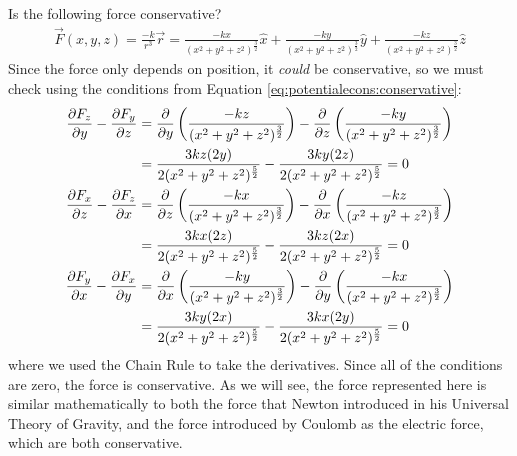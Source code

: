 \begin{example}{\label{ex:potentialecons:gravitycons}Is the following force conservative?
\begin{align*}
\vec F(x,y,z) = \frac{-k}{r^3}\vec r = \frac{-kx}{(x^2+y^2+z^2)^\frac{3}{2}}\hat x + \frac{-ky}{(x^2+y^2+z^2)^\frac{3}{2}}\hat y + \frac{-kz}{(x^2+y^2+z^2)^\frac{3}{2}}\hat z
\end{align*}}
Since the force only depends on position, it \textit{could} be conservative, so we must check using the conditions from Equation \ref{eq:potentialecons:conservative}:
\begin{align*}
\frac{\partial F_z}{\partial y}-\frac{\partial F_y}{\partial z} &= \frac{\partial }{\partial y}\left(\frac{-kz}{(x^2+y^2+z^2)^\frac{3}{2}}\right)-\frac{\partial }{\partial z}\left( \frac{-ky}{(x^2+y^2+z^2)^\frac{3}{2}}\right)\\
&=\frac{3kz(2y)}{2(x^2+y^2+z^2)^\frac{5}{2}}-\frac{3ky(2z)}{2(x^2+y^2+z^2)^\frac{5}{2}} = 0\\
\frac{\partial F_x}{\partial z}-\frac{\partial F_z}{\partial x} &= \frac{\partial }{\partial z}\left(\frac{-kx}{(x^2+y^2+z^2)^\frac{3}{2}}\right)-\frac{\partial }{\partial x}\left( \frac{-kz}{(x^2+y^2+z^2)^\frac{3}{2}}\right)\\
&=\frac{3kx(2z)}{2(x^2+y^2+z^2)^\frac{5}{2}}-\frac{3kz(2x)}{2(x^2+y^2+z^2)^\frac{5}{2}} = 0\\
\frac{\partial F_y}{\partial x}-\frac{\partial F_x}{\partial y} &= \frac{\partial }{\partial x}\left(\frac{-ky}{(x^2+y^2+z^2)^\frac{3}{2}}\right)-\frac{\partial }{\partial y}\left( \frac{-kx}{(x^2+y^2+z^2)^\frac{3}{2}}\right)\\
&=\frac{3ky(2x)}{2(x^2+y^2+z^2)^\frac{5}{2}}-\frac{3kx(2y)}{2(x^2+y^2+z^2)^\frac{5}{2}} = 0
\end{align*}
where we used the Chain Rule to take the derivatives. Since all of the conditions are zero, the force is conservative. As we will see, the force represented here is similar mathematically to both the force that Newton introduced in his Universal Theory of Gravity, and the force introduced by Coulomb as the electric force, which are both conservative.
\end{example}


